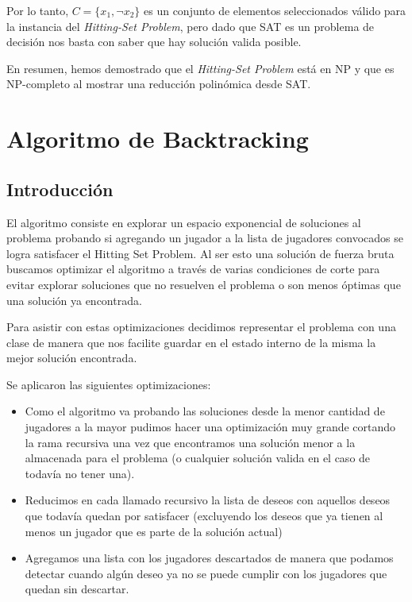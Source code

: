 \documentclass{estilo}
\begin{document}
Por lo tanto, \(C = \{x_1, \neg x_2\}\) es un conjunto de elementos seleccionados válido para la instancia del \textit{Hitting-Set Problem}, pero dado que SAT es un problema de decisión nos basta con saber que hay solución valida posible.

En resumen, hemos demostrado que el \textit{Hitting-Set Problem} está en NP y que es NP-completo al mostrar una reducción polinómica desde SAT.

\section{Algoritmo de Backtracking}

\subsection{Introducción}
El algoritmo consiste en explorar un espacio exponencial de soluciones al problema probando si agregando un jugador a la lista de jugadores convocados se logra satisfacer el Hitting Set Problem. Al ser esto una solución de fuerza bruta buscamos optimizar el algoritmo a través de varias condiciones de corte para evitar explorar soluciones que no resuelven el problema o son menos óptimas que una solución ya encontrada. 

Para asistir con estas optimizaciones decidimos representar el problema con una clase de manera que nos facilite guardar en el estado interno de la misma la mejor solución encontrada.

Se aplicaron las siguientes optimizaciones:
\begin{itemize}
\item{Como el algoritmo va probando las soluciones desde la menor cantidad de jugadores a la mayor pudimos hacer una optimización muy grande cortando la rama recursiva una vez que encontramos una solución menor a la almacenada para el problema (o cualquier solución valida en el caso de todavía no tener una).}

\item {Reducimos en cada llamado recursivo la lista de deseos con aquellos deseos que todavía quedan por satisfacer (excluyendo los deseos que ya tienen al menos un jugador que es parte de la solución actual)}

\item {Agregamos una lista con los jugadores descartados de manera que podamos detectar cuando algún deseo ya no se puede cumplir con los jugadores que quedan sin descartar.}

\end{itemize}
\end{document}
